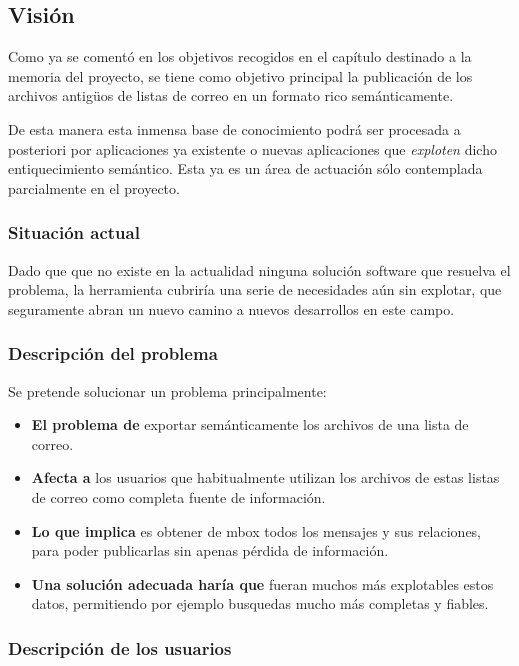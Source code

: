 
\subsection{Visión}

Como ya se comentó en los objetivos recogidos en el capítulo destinado a
la memoria del proyecto, se tiene como objetivo principal la publicación 
de los archivos antigüos de listas de correo en un formato rico 
semánticamente.

De esta manera esta inmensa base de conocimiento podrá ser procesada a 
posteriori por aplicaciones ya existente o nuevas aplicaciones que 
\emph{exploten} dicho entiquecimiento semántico. Esta ya es un área de 
actuación sólo contemplada parcialmente en el proyecto.

\subsubsection{Situación actual}

Dado que que no existe en la actualidad ninguna solución software que
resuelva el problema, la herramienta cubriría una serie de necesidades
aún sin explotar, que seguramente abran un nuevo camino a nuevos 
desarrollos en este campo.

\subsubsection{Descripción del problema}

Se pretende solucionar un problema principalmente:

\begin{itemize}
  \item \textbf{El problema de} exportar semánticamente los archivos 
	de una lista de correo.
  \item \textbf{Afecta a} los usuarios que habitualmente utilizan los 
	archivos de estas listas de correo como completa fuente de 
	información.
  \item \textbf{Lo que implica} es obtener de mbox todos los mensajes 
	y sus relaciones, para poder publicarlas sin apenas pérdida de
	información.
  \item \textbf{Una solución adecuada haría que} fueran muchos más
	explotables estos datos, permitiendo por ejemplo busquedas
	mucho más completas y fiables.
\end{itemize}

\subsubsection{Descripción de los usuarios}

